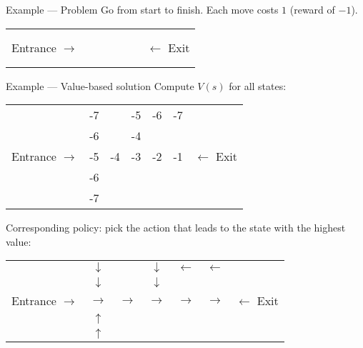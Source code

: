 \begin{frame}{Example --- Problem}
  Go from start to finish. Each move costs $1$ (reward of $-1$).

  \begin{tabular}{c|c|c|c|c|c|c}
    \cline{2-6}
     & & \cellcolor{black} & & & & \\
    \cline{2-6}
     & & \cellcolor{black} & & \cellcolor{black} & \cellcolor{black} & \\
    \cline{2-6}
    Entrance $\rightarrow$ & \phantom{-5} & \phantom{-5} & \phantom{-5} & \phantom{-5} & \phantom{-5} & $\leftarrow$ Exit \\
    \cline{2-6}
     & & \cellcolor{black} & \cellcolor{black} & \cellcolor{black} & \cellcolor{black} & \\
    \cline{2-6}
     & & \cellcolor{black} & \cellcolor{black} & \cellcolor{black} & \cellcolor{black} & \\
    \cline{2-6}
  \end{tabular}
\end{frame}

\begin{frame}{Example --- Value-based solution}
  Compute $V(s)$ for all states:

  \begin{tabular}{c|c|c|c|c|c|c}
    \cline{2-6}
      & -7 & \cellcolor{black} & -5 & -6 & -7 & \\
      \cline{2-6}
      & -6 & \cellcolor{black} & -4 & \cellcolor{black} & \cellcolor{black} & \\
      \cline{2-6}
      Entrance $\rightarrow$ & -5 & -4 & -3 & -2 & -1 & $\leftarrow$ Exit \\
      \cline{2-6}
      & -6 & \cellcolor{black} & \cellcolor{black} & \cellcolor{black} & \cellcolor{black} & \\
      \cline{2-6}
      & -7 & \cellcolor{black} & \cellcolor{black} & \cellcolor{black} & \cellcolor{black} & \\
      \cline{2-6}
  \end{tabular}

  \pause

  Corresponding policy: pick the action that leads to the state with the highest value:

  \begin{tabular}{c|c|c|c|c|c|c}
    \cline{2-6}
      & $\downarrow$ & \cellcolor{black} & $\downarrow$ & $\leftarrow$ & $\leftarrow$ & \\
      \cline{2-6}
      & $\downarrow$ & \cellcolor{black} & $\downarrow$ & \cellcolor{black} & \cellcolor{black} & \\
      \cline{2-6}
      Entrance $\rightarrow$ & $\rightarrow$ & $\rightarrow$ & $\rightarrow$ & $\rightarrow$ & $\rightarrow$ & $\leftarrow$ Exit \\
      \cline{2-6}
      & $\uparrow$ & \cellcolor{black} & \cellcolor{black} & \cellcolor{black} & \cellcolor{black} & \\
      \cline{2-6}
      & $\uparrow$ & \cellcolor{black} & \cellcolor{black} & \cellcolor{black} & \cellcolor{black} & \\
      \cline{2-6}
  \end{tabular}
\end{frame}

